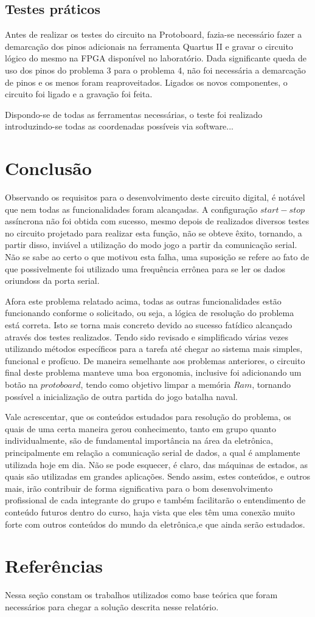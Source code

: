\documentclass[12pt]{article}
\begin{document}
\subsection{Testes práticos}
Antes de realizar os testes do circuito na Protoboard, fazia-se necessário fazer a demarcação dos pinos adicionais na ferramenta Quartus II e  gravar o circuito lógico do mesmo na FPGA disponível no laboratório. Dada significante queda de uso dos pinos do problema 3 para o problema 4, não foi necessária a demarcação de pinos e os menos foram reaproveitados. Ligados os novos componentes, o circuito foi ligado e a gravação foi feita.


Dispondo-se de todas as ferramentas necessárias, o teste foi realizado introduzindo-se todas as coordenadas possíveis via software... %


\section{Conclusão}

Observando os requisitos para o desenvolvimento deste circuito digital, é notável que nem todas as funcionalidades foram alcançadas. A configuração $start-stop$ assíncrona não foi obtida com sucesso, mesmo depois de realizados diversos testes no circuito projetado para realizar esta função, não se obteve êxito, tornando, a partir disso, inviável a utilização do modo jogo a partir da comunicação serial. Não se sabe ao certo o que motivou esta falha, uma suposição se refere ao fato de que possivelmente foi utilizado uma frequência errônea para se ler os dados oriundoss da porta serial.

Afora este problema relatado acima, todas as outras funcionalidades estão funcionando conforme o solicitado, ou seja, a lógica de resolução do problema está correta. Isto se torna mais concreto devido ao sucesso fatídico alcançado através dos testes realizados. Tendo sido revisado e simplificado várias vezes utilizando métodos específicos para a tarefa até chegar ao sistema mais simples, funcional e profícuo. De maneira semelhante aos problemas anteriores, o circuito final deste problema manteve uma boa ergonomia, inclusive foi adicionando um botão na $protoboard$, tendo como objetivo limpar a memória $Ram$, tornando possível a inicialização de outra partida do jogo batalha naval. 

Vale acrescentar, que os conteúdos estudados para resolução do problema, os quais de uma certa maneira gerou conhecimento, tanto em grupo quanto individualmente, são de fundamental importância na área da eletrônica, principalmente em relação a comunicação serial de dados, a qual é amplamente utilizada hoje em dia. Não se pode esquecer, é claro, das máquinas de estados, as quais são utilizadas em grandes aplicações. Sendo assim, estes conteúdos, e outros mais, irão contribuir de forma significativa para o bom desenvolvimento profissional de cada integrante do grupo e também facilitarão o entendimento de conteúdo futuros dentro do curso, haja vista que eles têm uma conexão muito forte com outros conteúdos do mundo da eletrônica,e que ainda serão estudados.


\section{Referências}

Nessa seção constam os trabalhos utilizados como base teórica que foram necessários para chegar a solução descrita nesse relatório.




\end{document}

